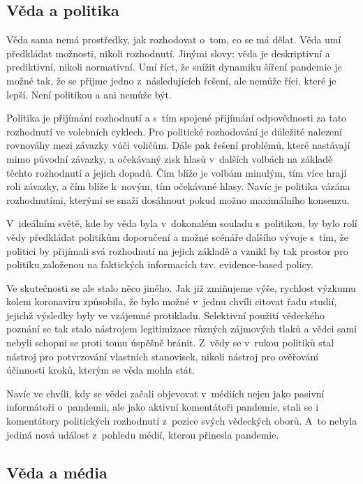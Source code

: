 \subsection*{Věda a politika}

Věda sama nemá prostředky, jak rozhodovat o~tom, co se má dělat. Věda umí předkládat možnosti, nikoli rozhodnutí. Jinými slovy: věda je deskriptivní a prediktivní, nikoli normativní. Umí říct, že snížit dynamiku šíření pandemie je možné tak, že se přijme jedno z~následujících řešení, ale nemůže říci, které je lepší. Není politikou a ani nemůže být.

Politika je přijímání rozhodnutí a s~tím spojené přijímání odpovědnosti za tato rozhodnutí ve volebních cyklech. Pro politické rozhodování je důležité nalezení rovnováhy mezi závazky vůči voličům. Dále pak řešení problémů, které nastávají mimo původní závazky, a očekávaný zisk hlasů v~dalších volbách na základě těchto rozhodnutí a jejich dopadů. Čím blíže je volbám minulým, tím více hrají roli závazky, a čím blíže k~novým, tím očekávané hlasy. Navíc je politika vázána rozhodnutími, kterými se snaží dosáhnout pokud možno maximálního konsenzu.

V~ideálním světě, kde by věda byla v~dokonalém souladu s~politikou, by bylo rolí vědy předkládat politikům doporučení a možné scénáře dalšího vývoje s~tím, že politici by přijímali svá rozhodnutí na jejich základě a vznikl by tak prostor pro politiku založenou na faktických informacích tzv. evidence-based policy.

Ve skutečnosti se ale stalo něco jiného. Jak již zmiňujeme výše, rychlost výzkumu kolem koronaviru způsobila, že bylo možné v~jednu chvíli citovat řadu studií, jejichž výsledky byly ve vzájemné protikladu. Selektivní použití vědeckého poznání se tak stalo nástrojem legitimizace různých zájmových tlaků a vědci sami nebyli schopni se proti tomu úspěšně bránit. Z~vědy se v~rukou politiků stal nástroj pro potvrzování vlastních stanovisek, nikoli nástroj pro ověřování účinnosti kroků, kterým se věda mohla stát.

Navíc ve chvíli, kdy se vědci začali objevovat v~médiích nejen jako pasivní informátoři o~pandemii, ale jako aktivní komentátoři pandemie, stali se i komentátory politických rozhodnutí z~pozice svých vědeckých oborů. A~to nebyla jediná nová událost z~pohledu médií, kterou přinesla pandemie.

\subsection*{Věda a média}

